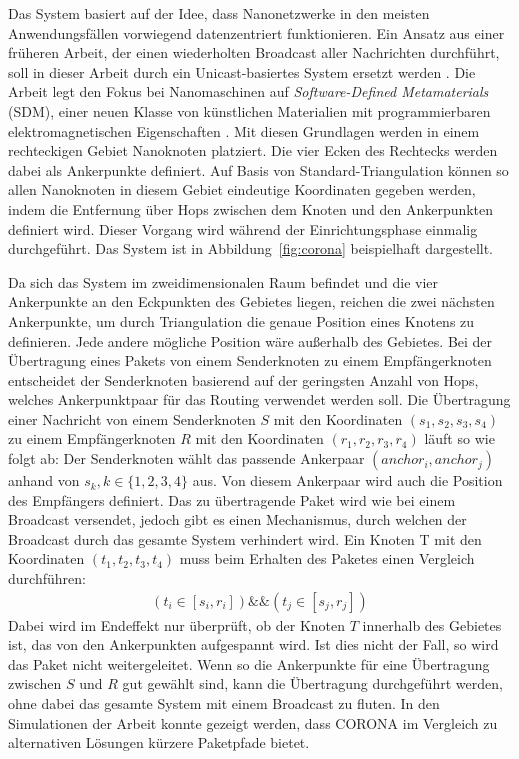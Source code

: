 Das System basiert auf der Idee, dass Nanonetzwerke in den meisten Anwendungsfällen vorwiegend datenzentriert funktionieren. Ein Ansatz aus einer früheren Arbeit, der einen wiederholten Broadcast aller Nachrichten durchführt, soll in dieser Arbeit durch ein Unicast-basiertes System ersetzt werden \cite{liaskos2015flood}. Die Arbeit legt den Fokus bei Nanomaschinen auf \emph{Software-Defined Metamaterials} (SDM), einer neuen Klasse von künstlichen Materialien mit programmierbaren elektromagnetischen Eigenschaften \cite{liaskos2015sdm}. Mit diesen Grundlagen werden in einem rechteckigen Gebiet Nanoknoten platziert. Die vier Ecken des Rechtecks werden dabei als Ankerpunkte definiert. Auf Basis von Standard-Triangulation können so allen Nanoknoten in diesem Gebiet eindeutige Koordinaten gegeben werden, indem die Entfernung über Hops zwischen dem Knoten und den Ankerpunkten definiert wird. Dieser Vorgang wird während der Einrichtungsphase einmalig durchgeführt. Das System ist in Abbildung~\ref{fig:corona} beispielhaft dargestellt. 

Da sich das System im zweidimensionalen Raum befindet und die vier Ankerpunkte an den Eckpunkten des Gebietes liegen, reichen die zwei nächsten Ankerpunkte, um durch Triangulation die genaue Position eines Knotens zu definieren. Jede andere mögliche Position wäre außerhalb des Gebietes. Bei der Übertragung eines Pakets von einem Senderknoten zu einem Empfängerknoten entscheidet der Senderknoten basierend auf der geringsten Anzahl von Hops, welches Ankerpunktpaar für das Routing verwendet werden soll. Die Übertragung einer Nachricht von einem Senderknoten $S$ mit den Koordinaten $(s_1, s_2, s_3, s_4)$ zu einem Empfängerknoten $R$ mit den Koordinaten $(r_1, r_2, r_3, r_4)$ läuft so wie folgt ab: Der Senderknoten wählt das passende Ankerpaar $(anchor_i, anchor_j)$ anhand von $s_k, k\in\{1,2,3,4\}$ aus. Von diesem Ankerpaar wird auch die Position des Empfängers definiert. Das zu übertragende Paket wird wie bei einem Broadcast versendet, jedoch gibt es einen Mechanismus, durch welchen der Broadcast durch das gesamte System verhindert wird.
Ein Knoten T mit den Koordinaten $(t_1, t_2, t_3, t_4)$ muss beim Erhalten des Paketes einen Vergleich durchführen:
\begin{align*}
    (t_i \in [s_i, r_i]) \&\& (t_j \in [s_j , r_j ]) 
\end{align*}
Dabei wird im Endeffekt nur überprüft, ob der Knoten $T$ innerhalb des Gebietes ist, das von den Ankerpunkten aufgespannt wird. Ist dies nicht der Fall, so wird das Paket nicht weitergeleitet.
Wenn so die Ankerpunkte für eine Übertragung zwischen $S$ und $R$ gut gewählt sind, kann die Übertragung durchgeführt werden, ohne dabei das gesamte System mit einem Broadcast zu fluten. In den Simulationen der Arbeit konnte gezeigt werden, dass CORONA im Vergleich zu alternativen Lösungen kürzere Paketpfade bietet.


